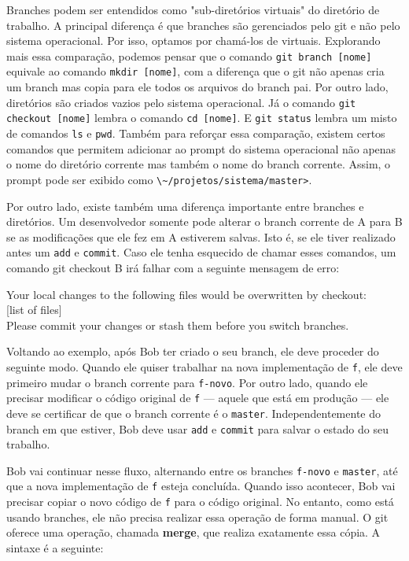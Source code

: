 \documentclass[
  11pt,
  twoside]{book}
\newcommand{\passthrough}[1]{#1}
\begin{document}
Branches podem ser entendidos como "sub-diretórios virtuais" do
diretório de trabalho. A principal diferença é que branches são
gerenciados pelo git e não pelo sistema operacional. Por isso, optamos
por chamá-los de virtuais. Explorando mais essa comparação, podemos
pensar que o comando \passthrough{\lstinline!git branch [nome]!}
equivale ao comando \passthrough{\lstinline!mkdir [nome]!}, com a
diferença que o git não apenas cria um branch mas copia para ele todos
os arquivos do branch pai. Por outro lado, diretórios são criados vazios
pelo sistema operacional. Já o comando
\passthrough{\lstinline!git checkout [nome]!} lembra o comando
\passthrough{\lstinline!cd [nome]!}. E
\passthrough{\lstinline!git status!} lembra um misto de comandos
\passthrough{\lstinline!ls!} e \passthrough{\lstinline!pwd!}. Também
para reforçar essa comparação, existem certos comandos que permitem
adicionar ao prompt do sistema operacional não apenas o nome do
diretório corrente mas também o nome do branch corrente. Assim, o prompt
pode ser exibido como
\passthrough{\lstinline!\~/projetos/sistema/master>!}.

Por outro lado, existe também uma diferença importante entre branches e
diretórios. Um desenvolvedor somente pode alterar o branch corrente de A
para B se as modificações que ele fez em A estiverem salvas. Isto é, se
ele tiver realizado antes um \passthrough{\lstinline!add!} e
\passthrough{\lstinline!commit!}. Caso ele tenha esquecido de chamar
esses comandos, um comando git checkout B irá falhar com a seguinte
mensagem de erro:

Your local changes to the following files would be overwritten by
checkout:\\
{[}list of files{]}\\
Please commit your changes or stash them before you switch branches.

Voltando ao exemplo, após Bob ter criado o seu branch, ele deve proceder
do seguinte modo. Quando ele quiser trabalhar na nova implementação de
\passthrough{\lstinline!f!}, ele deve primeiro mudar o branch corrente
para \passthrough{\lstinline!f-novo!}. Por outro lado, quando ele
precisar modificar o código original de \passthrough{\lstinline!f!} ---
aquele que está em produção --- ele deve se certificar de que o branch
corrente é o \passthrough{\lstinline!master!}. Independentemente do
branch em que estiver, Bob deve usar \passthrough{\lstinline!add!} e
\passthrough{\lstinline!commit!} para salvar o estado do seu trabalho.

 Bob vai continuar nesse fluxo, alternando entre os
branches \passthrough{\lstinline!f-novo!} e
\passthrough{\lstinline!master!}, até que a nova implementação de
\passthrough{\lstinline!f!} esteja concluída. Quando isso acontecer, Bob
vai precisar copiar o novo código de \passthrough{\lstinline!f!} para o
código original. No entanto, como está usando branches, ele não precisa
realizar essa operação de forma manual. O git oferece uma operação,
chamada \textbf{merge}, que realiza exatamente essa cópia. A sintaxe é a
seguinte:
\end{document}
